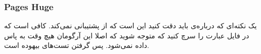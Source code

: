 \subsubsection{Pages Huge}
یک نکته‌ای که درباره‌ی
باید دقت کنید این است که
از
پشتیبانی نمی‌کند. کافی است که در فایل
عبارت
را سرچ کنید که متوجه شوید که اصلا این آرگومان هیچ وقت به
پاس داده نمی‌شود. پس گرفتن تست‌های
بیهوده است.